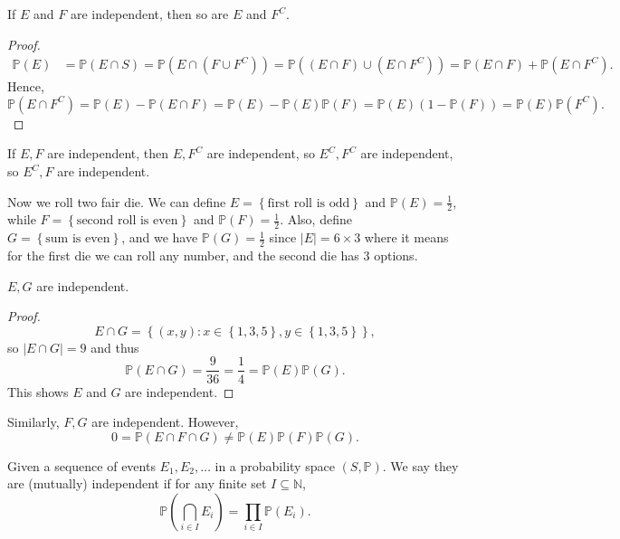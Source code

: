 \begin{proposition}
    If \(E\) and \(F\) are independent, then so are \(E\) and \(F^C\).    
\end{proposition}
\begin{proof}
    \begin{align*}
        \mathbb{P} (E) &= \mathbb{P} (E \cap S) = \mathbb{P} (E \cap (F \cup F^C)) = \mathbb{P}((E \cap F) \cup (E \cap F^C)) = \mathbb{P} (E \cap F) + \mathbb{P} (E \cap F^C). 
    \end{align*}
    Hence,
    \[
        \mathbb{P} (E \cap F^C) = \mathbb{P} (E) - \mathbb{P} (E \cap F) = \mathbb{P} (E) - \mathbb{P} (E) \mathbb{P} (F) = \mathbb{P} (E) (1 - \mathbb{P} (F)) = \mathbb{P} (E) \mathbb{P} (F^C).
    \]
\end{proof}

\begin{corollary}
    If \(E, F\) are independent, then \(E, F^C\) are independent, so \(E^C, F^C\) are independent, so \(E^C, F\) are independent.    
\end{corollary}

\begin{eg}
    Now we roll two fair die. We can define \(E = \left\{ \text{first roll is odd}  \right\} \) and \(\mathbb{P} (E) = \frac{1}{2}\), while \(F = \left\{ \text{second roll is even}  \right\} \) and \(\mathbb{P} (F) = \frac{1}{2}\). Also, define \(G = \left\{ \text{sum is even}  \right\} \), and we have \(\mathbb{P} (G) = \frac{1}{2}\) since \(\vert E \vert = 6 \times 3\) where it means for the first die we can roll any number, and the second die has \(3\) options.
    \begin{claim}
        \(E, G\) are independent. 
    \end{claim}    
    \begin{proof}
        \[
            E \cap G = \left\{ (x, y): x \in \left\{ 1, 3, 5 \right\}, y \in \left\{ 1, 3, 5 \right\}   \right\}, 
        \]
        so \(\vert E \cap G \vert = 9\) and thus 
        \[
            \mathbb{P} (E \cap G) = \frac{9}{36} = \frac{1}{4} = \mathbb{P} (E) \mathbb{P} (G).
        \]
        This shows \(E\) and \(G\) are independent.   
    \end{proof}
    Similarly, \(F, G\) are independent. However,
    \[
        0 = \mathbb{P} (E \cap F \cap G) \neq \mathbb{P} (E) \mathbb{P} (F) \mathbb{P} (G).
    \] 
\end{eg}

\begin{definition}
    Given a sequence of events \(E_1, E_2, \dots \) in a probability space \((S, \mathbb{P} )\). We say they are (mutually) independent if for any finite set \(I \subseteq \mathbb{N} \),
    \[
        \mathbb{P} \left( \bigcap_{i \in I} E_i  \right) = \prod_{i \in I} \mathbb{P} (E_i). 
    \]   
\end{definition}

